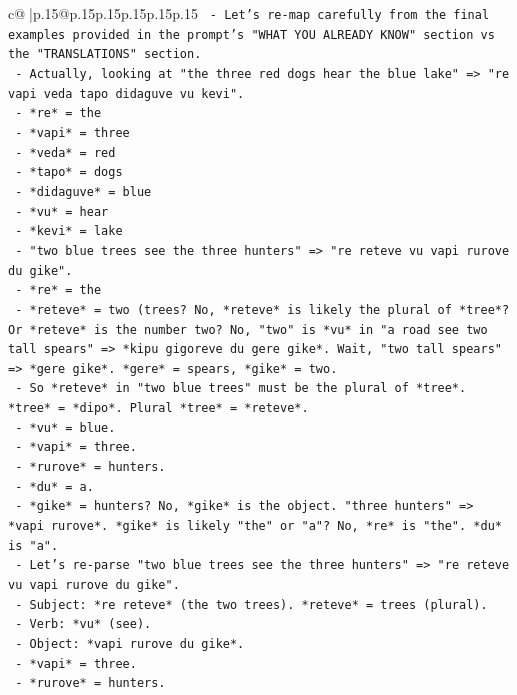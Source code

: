 \documentclass{article}
\begin{document}
{\begin{supertabular}{c@{$\;$}|p{.15\linewidth}@{}p{.15\linewidth}p{.15\linewidth}p{.15\linewidth}p{.15\linewidth}p{.15\linewidth}}
{{{\texttt{  {-} Let's re{-}map carefully from the final examples provided in the prompt's "WHAT YOU ALREADY KNOW" section vs the "TRANSLATIONS" section.} \\
\texttt{  {-} Actually, looking at "the three red dogs hear the blue lake" => "re vapi veda tapo didaguve vu kevi".} \\
\texttt{    {-} *re* = the} \\
\texttt{    {-} *vapi* = three} \\
\texttt{    {-} *veda* = red} \\
\texttt{    {-} *tapo* = dogs} \\
\texttt{    {-} *didaguve* = blue} \\
\texttt{    {-} *vu* = hear} \\
\texttt{    {-} *kevi* = lake} \\
\texttt{  {-} "two blue trees see the three hunters" => "re reteve vu vapi rurove du gike".} \\
\texttt{    {-} *re* = the} \\
\texttt{    {-} *reteve* = two (trees? No, *reteve* is likely the plural of *tree*? Or *reteve* is the number two? No, "two" is *vu* in "a road see two tall spears" => *kipu gigoreve du gere gike*. Wait, "two tall spears" => *gere gike*. *gere* = spears, *gike* = two.} \\
\texttt{    {-} So *reteve* in "two blue trees" must be the plural of *tree*. *tree* = *dipo*. Plural *tree* = *reteve*.} \\
\texttt{    {-} *vu* = blue.} \\
\texttt{    {-} *vapi* = three.} \\
\texttt{    {-} *rurove* = hunters.} \\
\texttt{    {-} *du* = a.} \\
\texttt{    {-} *gike* = hunters? No, *gike* is the object. "three hunters" => *vapi rurove*. *gike* is likely "the" or "a"? No, *re* is "the". *du* is "a".} \\
\texttt{    {-} Let's re{-}parse "two blue trees see the three hunters" => "re reteve vu vapi rurove du gike".} \\
\texttt{      {-} Subject: *re reteve* (the two trees). *reteve* = trees (plural).} \\
\texttt{      {-} Verb: *vu* (see).} \\
\texttt{      {-} Object: *vapi rurove du gike*.} \\
\texttt{        {-} *vapi* = three.} \\
\texttt{        {-} *rurove* = hunters.} \\
}}}
\end{supertabular}}
\end{document}
